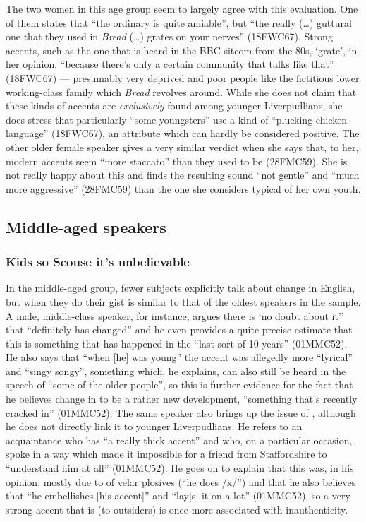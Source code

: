 The two women in this age group seem to largely agree with this evaluation.
One of them states that ``the ordinary  is quite amiable'', but ``the really (\ldots) guttural one that they used in \emph{Bread} (\ldots) grates on your nerves'' (18FWC67).
Strong accents, such as the one that is heard in the BBC sitcom from the 80s, `grate', in her opinion, ``because there's only a certain community that talks like that'' (18FWC67) --- presumably very deprived and poor people like the fictitious lower working-class family which \emph{Bread} revolves around.
While she does not claim that these kinds of accents are \emph{exclusively} found among younger Liverpudlians, she does stress that particularly ``some youngsters'' use a kind of ``plucking chicken language'' (18FWC67), an attribute which can hardly be considered positive.
The other older female speaker gives a very similar verdict when she says that, to her, modern  accents seem ``more staccato'' than they used to be (28FMC59).
She is not really happy about this and finds the resulting sound ``not gentle'' and ``much more aggressive'' (28FMC59) than the one she considers typical of her own youth.

\subsection{Middle-aged speakers}
\label{aware_res.eval.mid}

\subsubsection{Kids so Scouse it's unbelievable}
\label{aware_res.eval.mid.change}

In the middle-aged group, fewer subjects explicitly talk about change in  English, but when they do their gist is similar to that of the oldest speakers in the sample.
A male, middle-class speaker, for instance, argues there is `no doubt about it'' that  ``definitely has changed'' and he even provides a quite precise estimate that this is something that has happened in the ``last sort of 10 years'' (01MMC52).
He also says that ``when [he] was young'' the accent was allegedly more ``lyrical'' and ``singy songy'', something which, he explains, can also still be heard in the speech of ``some of the older people'', so this is further evidence for the fact that he believes change in  to be a rather new development, ``something that's recently cracked in'' (01MMC52).
The same speaker also brings up the issue of , although he does not directly link it to younger Liverpudlians.
He refers to an acquaintance who has ``a really thick accent'' and who, on a particular occasion, spoke in a way which made it impossible for a friend from Staffordshire to ``understand him at all'' (01MMC52).
He goes on to explain that this was, in his opinion, mostly due to  of velar plosives (``he does /x/'') and that he also believes that ``he embellishes [his accent]'' and ``lay[s] it on a lot'' (01MMC52), so a very strong accent that is  (to outsiders) is once more associated with inauthenticity.

